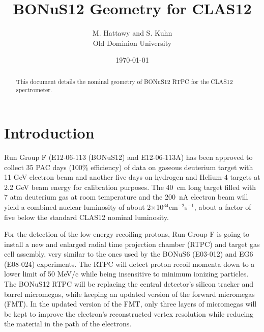 \documentclass[12pt]{article}
\begin{document}
\title{BONuS12 Geometry for CLAS12}

\vskip 0.5cm

\author{M. Hattawy and S. Kuhn\\ Old Dominion University\\}

\date \today
%
\maketitle

\begin{abstract}
This document details the nominal geometry of BONuS12 RTPC for the CLAS12 
   spectrometer.
\end{abstract}

\section{Introduction}

Run Group F (E12-06-113 (BONuS12) and E12-06-113A) has been approved to collect 
35 PAC days (100\% efficiency) of data on gaseous deuterium target with 11 GeV 
electron beam and another five days on hydrogen and Helium-4 targets at 2.2 GeV 
beam energy for calibration purposes. The 40~cm long target filled with 7 atm 
deuterium gas at room temperature and the 200~nA electron beam will yield a 
combined nuclear luminosity of about 2$\times$10$^{34}$cm$^{-2}$s$^{-1}$, about 
a factor of five below the standard CLAS12 nominal luminosity.

For the detection of the low-energy recoiling protons, Run Group F is going to 
install a new and enlarged radial time projection chamber (RTPC) and target gas 
cell assembly, very similar to the ones used by the BONuS6 (E03-012) and EG6 
(E08-024) experiments. The RTPC will detect proton recoil momenta down to a 
lower limit of 50 MeV/c while being insensitive to minimum ionizing particles.  
The BONuS12 RTPC will be replacing the central detector's silicon tracker
and barrel micromegas, while keeping an updated version of the forward 
micromegas (FMT). In the updated version of the FMT, only three layers of 
micromegas will be kept to improve the electron's reconstructed vertex 
resolution while reducing the material in the path of the electrons.


\end{document}
